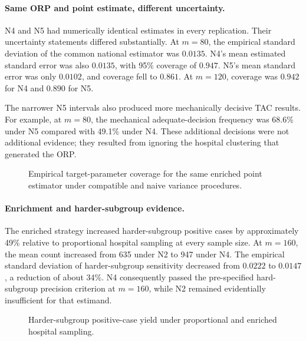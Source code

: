 \paragraph{Same ORP and point estimate, different uncertainty.}
N4 and N5 had numerically identical estimates in every replication. Their
uncertainty statements differed substantially. At \(m=80\), the empirical
standard deviation of the common national estimator was \(0.0135\). N4's mean
estimated standard error was also \(0.0135\), with 95\% coverage of \(0.947\).
N5's mean standard error was only \(0.0102\), and coverage fell to \(0.861\).
At \(m=120\), coverage was \(0.942\) for N4 and \(0.890\) for N5.

The narrower N5 intervals also produced more mechanically decisive TAC
results. For example, at \(m=80\), the mechanical adequate-decision frequency
was 68.6\% under N5 compared with 49.1\% under N4. These additional decisions
were not additional evidence; they resulted from ignoring the hospital
clustering that generated the ORP.



\begin{figure}[h!]
  \centering
  \caption{Empirical target-parameter coverage for the same enriched point estimator under compatible and naive variance procedures.}
  \label{fig:nav-coverage}
\end{figure}

\paragraph{Enrichment and harder-subgroup evidence.}
The enriched strategy increased harder-subgroup positive cases by
approximately 49\% relative to proportional hospital sampling at every sample
size. At \(m=160\), the mean count increased from 635 under N2 to 947 under
N4. The empirical standard deviation of harder-subgroup sensitivity decreased
from \(0.0222\) to \(0.0147\), a reduction of about 34\%. N4 consequently
passed the pre-specified hard-subgroup precision criterion at \(m=160\), while
N2 remained evidentially insufficient for that estimand.



\begin{figure}[h!]
  \centering
  \caption{Harder-subgroup positive-case yield under proportional and enriched hospital sampling.}
  \label{fig:nav-hard-yield}
\end{figure}

